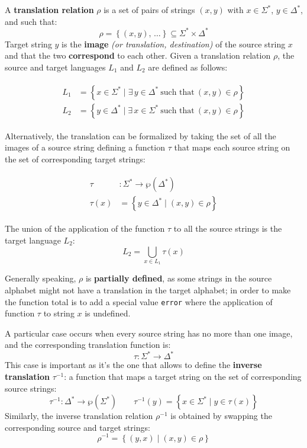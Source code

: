 \documentclass[english]{article}
\begin{document}
A \textbf{translation relation} \(\rho\) is a set of pairs of strings \(\left( x, y \right)\) with \(x \in \Sigma^\ast\), \(y \in \Delta^\ast\), and such that:
\[ \rho = \left\{ \left( x, y \right), \, \ldots \right\} \subseteq \Sigma^\ast \times \Delta^\ast \]
Target string \(y\) is the \textbf{image} \textit{(or translation, destination)} of the source string \(x\) and that the two \textbf{correspond} to each other.
Given a translation relation \(\rho\), the source and target languages \(L_1\) and \(L_2\) are defined as follows:

\begin{gather*}
  \begin{aligned}
    L_1 & = \left\{ x \in \Sigma^\ast \mid \exists\, y \in \Delta^\ast \ \text{such that} \ \left( x, y \right) \in \rho \right\} \\
    L_2 & = \left\{ y \in \Delta^\ast \mid \exists\, x \in \Sigma^\ast \ \text{such that} \ \left( x, y \right) \in \rho \right\}
  \end{aligned}
\end{gather*}

Alternatively, the translation can be formalized by taking the set of all the images of a source string defining a function \(\tau\) that maps each source string on the set of corresponding target strings:

\begin{gather*}
  \begin{aligned}
    \tau    & : \Sigma^\ast \rightarrow \wp \left( \Delta^\ast \right)               \\
    \tau(x) & = \left\{ y \in \Delta^\ast \mid \left( x, y \right) \in \rho \right\}
  \end{aligned}
\end{gather*}

The union of the application of the function \(\tau\) to all the source strings is the target language \(L_2\):
\[ L_2 = \bigcup_{x \in L_1} \tau(x) \]

Generally speaking, \(\rho\) is \textbf{partially defined}, as some strings in the source alphabet might not have a translation in the target alphabet;
in order to make the function total is to add a special value \texttt{error} where the application of function \(\tau\) to string \(x\) is undefined.

A particular case occurs when every source string has no more than one image, and the corresponding translation function is:
\[ \tau : \Sigma^\ast \rightarrow \Delta^\ast \]
This case is important as it's the one that allows to define the \textbf{inverse translation} \(\tau^{-1}\):
a function that maps a target string on the set of corresponding source strings:
\[ \tau^{-1} : \Delta^\ast \rightarrow \wp\left( \Sigma^\ast \right) \qquad \tau^{-1}(y) = \left\{ x \in \Sigma^\ast \mid y \in \tau(x) \right\} \]
Similarly, the inverse translation relation \(\rho^{-1}\) is obtained by swapping the corresponding source and target strings:
\[ \rho^{-1} = \left\{ \left( y, x \right) \mid \left( x, y \right) \in \rho \right\} \]
\end{document}
